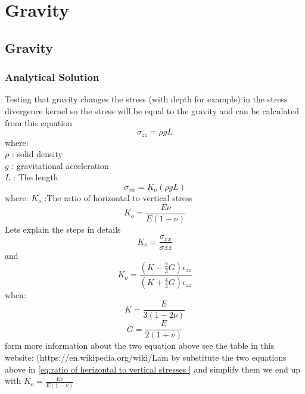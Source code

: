 \documentclass[]{scrreprt}
\begin{document}
\section{Gravity}
\subsection{Gravity}
\subsubsection{Analytical Solution}
Testing that gravity changes the stress (with depth for example) in the stress divergence kernel
so the stress will be equal to the gravity and can be calculated from this equation
\begin{equation}
\sigma_{zz}=\rho g L
\end{equation}
where: \\
$\rho$ : solid density\\
$g$ : gravitational acceleration \\
$L$ : The length \\
 \begin{equation}
 \sigma_{xx}= K_o(\rho g L) 
 \end{equation}
where:
$K_o$ :The ratio of horizontal to vertical stress 
\begin{equation}
K_o=\frac{E\nu}{E(1-\nu)}
\end{equation}
\ifshowallderivations
Lets explain the steps in details
\begin{equation}
K_o=\frac{\sigma_{xx}}{\sigma{zz}}
\end{equation}
and 
\begin{equation}
\label{eq:ratio of herizontal to vertical stresses }
K_o=\frac{ (K - \mbox{$\frac{2}{3}$}G)\epsilon_{zz}}{(K + \mbox{$\frac{4}{3}$}G)\epsilon_{zz}}
\end{equation}
when:\\
\begin{equation}
K=\frac{E}{3(1-2\nu)}
\end{equation}
\begin{equation}
G=\frac{E}{2(1+\nu)}
\end{equation}
form more information about the two equation above see the table in this website: (https://en.wikipedia.org/wiki/Lam%
by substitute the two equations above in \ref{eq:ratio of herizontal to vertical stresses } and simplify them we end up with 
$K_o=\frac{E\nu}{E(1-\nu)}$

\fi
\end{document}
